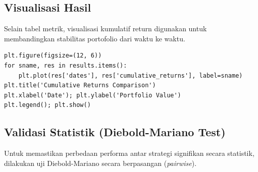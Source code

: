 \documentclass[12pt,a4paper]{article}
\begin{document}
\subsection{Visualisasi Hasil}
Selain tabel metrik, visualisasi kumulatif return digunakan untuk membandingkan stabilitas portofolio dari waktu ke waktu.

\begin{lstlisting}[caption={Plotting Cumulative Returns}]
plt.figure(figsize=(12, 6))
for sname, res in results.items():
    plt.plot(res['dates'], res['cumulative_returns'], label=sname)
plt.title('Cumulative Returns Comparison')
plt.xlabel('Date'); plt.ylabel('Portfolio Value')
plt.legend(); plt.show()
\end{lstlisting}

\subsection{Validasi Statistik (Diebold-Mariano Test)}
Untuk memastikan perbedaan performa antar strategi signifikan secara statistik, dilakukan uji Diebold-Mariano secara berpasangan (\textit{pairwise}).
\end{document}
